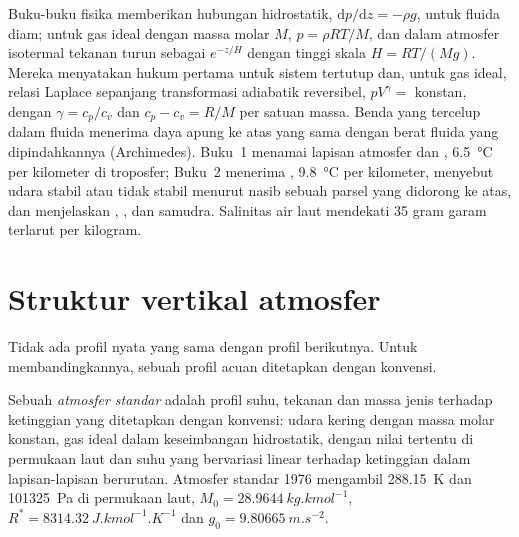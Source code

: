 \begin{recall}
Buku-buku fisika memberikan hubungan hidrostatik, $\mathrm dp/\mathrm dz =
-\rho g$, untuk fluida diam; untuk gas ideal dengan massa molar $M$, $p = \rho R
T/M$, dan dalam atmosfer isotermal tekanan turun sebagai $e^{-z/H}$ dengan tinggi
skala $H = RT/(Mg)$. Mereka menyatakan hukum pertama untuk sistem tertutup dan,
untuk gas ideal, relasi Laplace sepanjang transformasi adiabatik reversibel,
$pV^{\gamma} = $ konstan, dengan $\gamma = c_p/c_v$ dan $c_p - c_v
= R/M$ per satuan massa. Benda yang tercelup dalam fluida menerima daya apung ke
atas yang sama dengan berat fluida yang dipindahkannya (Archimedes). Buku~1 menamai
lapisan atmosfer dan  , \qty{6.5}{\celsius} per
kilometer di troposfer; Buku~2 menerima , \qty{9.8}{\celsius}
per kilometer, menyebut udara stabil atau tidak stabil menurut nasib sebuah parsel
yang didorong ke atas, dan menjelaskan , ,  dan
 samudra. Salinitas air laut mendekati 35 gram garam terlarut per kilogram.
\end{recall}

\section{Struktur vertikal atmosfer}\label{sec:b1:fluid-envelopes-structure:atmosphere}

Tidak ada profil nyata yang sama dengan profil berikutnya. Untuk membandingkannya, sebuah profil acuan ditetapkan dengan konvensi.

\begin{definition}\label{def:b1:fluid-envelopes-structure:standard-atmosphere}
Sebuah \emph{atmosfer standar} adalah profil suhu, tekanan dan massa jenis terhadap ketinggian yang ditetapkan dengan konvensi: udara kering dengan massa molar konstan, gas ideal dalam keseimbangan hidrostatik, dengan nilai tertentu di permukaan laut dan suhu yang bervariasi linear terhadap ketinggian dalam lapisan-lapisan berurutan. Atmosfer standar 1976 mengambil \qty{288.15}{K} dan \qty{101325}{Pa} di permukaan laut, $M_0 = \qty{28.9644}{kg.kmol^{-1}}$, $R^* = \qty{8314.32}{J.kmol^{-1}.K^{-1}}$ dan $g_0 = \qty{9.80665}{m.s^{-2}}$.
\end{definition}

